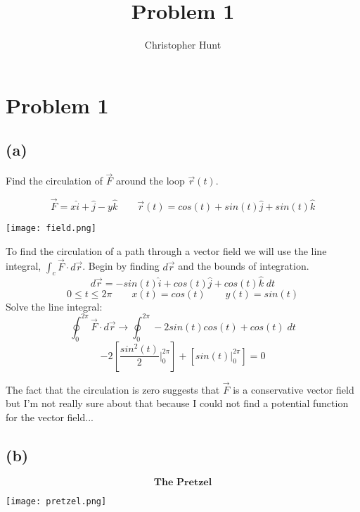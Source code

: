 \documentclass[11pt]{article}
\title{Problem 1}
\author{Christopher Hunt}
\date{}
\begin{document}
\pagestyle{fancy}
\fancyhf{}
\rhead{\thepage}
\maketitle

\section*{Problem 1}
\subsection*{(a)}

Find the circulation of $\vec{F}$ around the loop $\vec{r}(t)$.

$$\vec{F} = x\hat{i}+\hat{j}-y\hat{k} \qquad \vec{r}(t) = cos(t)+sin(t)\hat{j}+sin(t)\hat{k}$$
\begin{center}
    \texttt{[image: field.png]}
\end{center}
To find the circulation of a path through a vector field we will use the line integral, $\int_c \vec{F} \cdot d\vec{r}$. Begin by finding $d\vec{r}$ and the bounds of integration.
$$d\vec{r} = -sin(t)\hat{i} + cos(t)\hat{j}+cos(t)\hat{k}\;dt$$
$$ 0 \leq t \leq 2\pi \qquad x(t) = cos(t) \qquad y(t) = sin(t)$$
Solve the line integral:
$$\oint_0^{2\pi} \vec{F} \cdot d\vec{r} \rightarrow \oint_0^{2\pi} -2sin(t)cos(t) + cos(t)\;dt$$
$$-2 \left[ \frac{sin^2(t)}{2}|_0^{2\pi} \right] + \left[ sin(t)|_0^{2\pi} \right] = 0$$

The fact that the circulation is zero suggests that $\vec{F}$ is a conservative vector field but I'm not really sure about that because I could not find a potential function for the vector field...

\subsection*{(b)}
$$\textbf{The Pretzel}$$
\begin{center}
    \texttt{[image: pretzel.png]}
\end{center}
\end{document}

